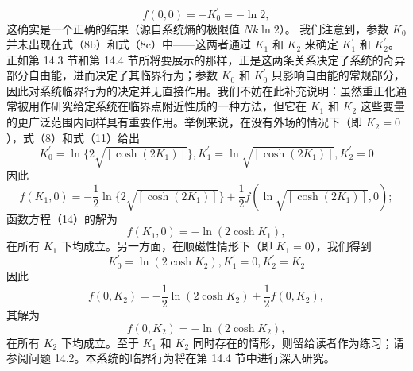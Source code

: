 \begin{equation}\tag{14.2.16}\label{eq:14.2.16}
f ( 0 , 0 ) = - K _ { 0 } ^{\prime} = - \ln 2 ,
\end{equation}
这确实是一个正确的结果（源自系统熵的极限值 \(Nk\ln2\)）。
我们注意到，参数 \(K_{0}\) 并未出现在式（8b）和式（8c）中——这两者通过 \(K_{1}\) 和 \(K_{2}\) 来确定 \(K_{1}^{\prime}\) 和 \(K_{2}^{\prime}\)。正如第 14.3 节和第 14.4 节所将要展示的那样，正是这两条关系决定了系统的奇异部分自由能，进而决定了其临界行为；参数 \(K_{0}\) 和 \(K_{0}^{\prime}\) 只影响自由能的常规部分，因此对系统临界行为的决定并无直接作用。我们不妨在此补充说明：虽然重正化通常被用作研究给定系统在临界点附近性质的一种方法，但它在 \(K_{1}\) 和 \(K_{2}\) 这些变量的更广泛范围内同样具有重要作用。举例来说，在没有外场的情况下（即 \(K_{2}=0\)），式（8）和式（11）给出
\begin{equation}\tag{14.2.17}\label{eq:14.2.17}
K _ { 0 } ^{\prime} = \ln \{ 2 \sqrt { [ \cosh ( 2 K _ { 1 } ) ] } \} ,  K _ { 1 } ^{\prime} = \ln \sqrt { [ \cosh ( 2 K _ { 1 } ) ] } ,  K _ { 2 } ^{\prime} = 0
\end{equation}
因此
\begin{equation}\tag{14.2.18}\label{eq:14.2.18}
f ( K _ { 1 } , 0 ) = - \frac { 1 } { 2 } \ln \{ 2 \sqrt { [ \cosh ( 2 K _ { 1 } ) ] } \} + \frac { 1 } { 2 } f ( \ln \sqrt { [ \cosh ( 2 K _ { 1 } ) ] } , 0 ) ;
\end{equation}
函数方程（14）的解为
\begin{equation}\tag{14.2.19}\label{eq:14.2.19}
f ( K _ { 1 } , 0 ) = - \ln ( 2 \cosh K _ { 1 } ) ,
\end{equation}
在所有 \(K_{1}\) 下均成立。另一方面，在顺磁性情形下（即 \(K_{1}=0\)），我们得到
\begin{equation}\tag{14.2.20}\label{eq:14.2.20}
K _ { 0 } ^{\prime} = \ln ( 2 \cosh K _ { 2 } ) ,  K _ { 1 } ^{\prime} = 0 ,  K _ { 2 } ^{\prime} = K _ { 2 }
\end{equation}
因此
\begin{equation}\tag{14.2.21}\label{eq:14.2.21}
f ( 0 , K _ { 2 } ) = - \frac { 1 } { 2 } \ln ( 2 \cosh K _ { 2 } ) + \frac { 1 } { 2 } f ( 0 , K _ { 2 } ) ,
\end{equation}
其解为
\begin{equation}\tag{14.2.22}\label{eq:14.2.22}
f ( 0 , K _ { 2 } ) = - \ln ( 2 \cosh K _ { 2 } ) ,
\end{equation}
在所有 \(K_2\) 下均成立。至于 \(K_1\) 和 \(K_2\) 同时存在的情形，则留给读者作为练习；请参阅问题 14.2。本系统的临界行为将在第 14.4 节中进行深入研究。
